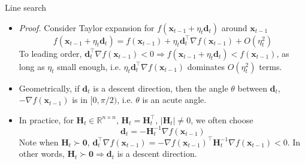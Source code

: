 \documentclass{beamer}
\numberwithin{equation}{section}
\begin{document}
\begin{frame}{Line search}
    \begin{itemize}
        \item
        \textit{Proof.} Consider Taylor expansion for $ f(\mathbf{x}_{t - 1} +
        \eta_t\mathbf{d}_t) $ around $ \mathbf{x}_{t - 1} $
        \begin{equation*}
            f(\mathbf{x}_{t - 1} + \eta_t\mathbf{d}_t) =
            f(\mathbf{x}_{t - 1}) + \eta_t\mathbf{d}_t^\top
            \nabla f(\mathbf{x}_{t - 1}) + O(\eta_t^2)
        \end{equation*}
        To leading order, $ \mathbf{d}_t^\top\nabla f(\mathbf{x}_{t - 1}) < 0
        \Rightarrow f(\mathbf{x}_{t - 1} + \eta_t\mathbf{d}_t) <
        f(\mathbf{x}_{t - 1}) $, as long as $ \eta_t $ small enough,
        i.e. $ \eta_t\mathbf{d}_t^\top\nabla f(\mathbf{x}_{t - 1}) $ dominates
        $ O(\eta_t^2) $ terms.

        \item
        Geometrically, if $ \mathbf{d}_t $ is a descent direction, then the
        angle $ \theta $ between $ \mathbf{d}_t $,
        $ -\nabla f(\mathbf{x}_{t - 1}) $ is in $ [0, \pi / 2) $, i.e.
        $ \theta $ is an acute angle.

        \item
        In practice, for $ \mathbf{H}_t \in \mathbb{R}^{n \times n} $,
        $ \mathbf{H}_t = \mathbf{H}_t^\top $, $ |\mathbf{H}_t| \ne 0 $, we
        often choose \cite{nocedal_opt}
        \begin{equation} \label{eq:gen_descent_step}
            \mathbf{d}_t = -\mathbf{H}_t^{-1}\nabla f(\mathbf{x}_{t - 1})
        \end{equation}
        Note when $ \mathbf{H}_t \succ \mathbf{0} $, $ \mathbf{d}_t^\top
        \nabla f(\mathbf{x}_{t - 1}) = -\nabla f(\mathbf{x}_{t - 1})^\top
        \mathbf{H}_t^{-1}\nabla f(\mathbf{x}_{t - 1}) < 0 $. In other words,
        $ \mathbf{H}_t \succ \mathbf{0} \Rightarrow \mathbf{d}_t $ is a
        descent direction.
    \end{itemize}
\end{frame}
\end{document}
